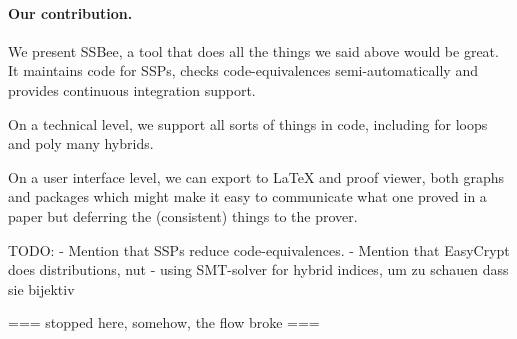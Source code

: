 

\paragraph{Our contribution.} We present SSBee, a tool that does all the things
we said above would be great. It maintains code for SSPs, checks code-equivalences
semi-automatically and provides continuous integration support.

On a technical level, we support all sorts of things in code, including for loops
and poly many hybrids.

On a user interface level, we can export to LaTeX and proof viewer, both graphs and packages which might make it easy to communicate what one proved in a paper but
deferring the (consistent) things to the prover.















TODO:
- Mention that SSPs reduce code-equivalences.
- Mention that EasyCrypt does distributions, nut 
- using SMT-solver for hybrid indices, um zu schauen dass sie bijektiv





=== stopped here, somehow, the flow broke ===

